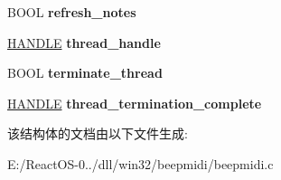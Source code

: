 \begin{DoxyCompactItemize}
B\+O\+OL {\bfseries refresh\+\_\+notes}
\item 
\mbox{\label{struct___device_info_a75c7181893fd587e75de51cbaa9876be}} 
\hyperlink{interfacevoid}{H\+A\+N\+D\+LE} {\bfseries thread\+\_\+handle}
\item 
\mbox{\label{struct___device_info_aa4636b23917d6394e5464f11aa5d9fb8}} 
B\+O\+OL {\bfseries terminate\+\_\+thread}
\item 
\mbox{\label{struct___device_info_a181a06085ebf9dbaf3c7586769277b29}} 
\hyperlink{interfacevoid}{H\+A\+N\+D\+LE} {\bfseries thread\+\_\+termination\+\_\+complete}
\end{DoxyCompactItemize}


该结构体的文档由以下文件生成\+:\begin{DoxyCompactItemize}
\item 
E\+:/\+React\+O\+S-\/0../dll/win32/beepmidi/beepmidi.\+c\end{DoxyCompactItemize}
